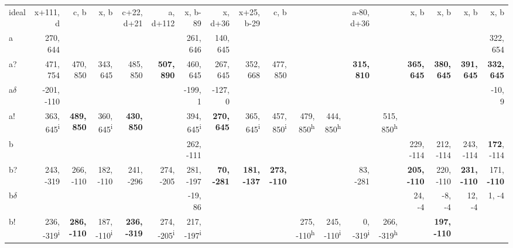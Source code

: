 \begin{table}[p]
{\begin{tabular}{lrrrrrrrrrrrrrrrrr}
ideal & x+111, d & c, b & x, b & c+22, d+21 & a, d+112 & x, b-89 & x, d+36 & x+25, b-29 & c, b &  &  & a-80, d+36 &  & x, b & x, b & x, b & x, b \\
a & 270, 644 &  &  &  &  & 261, 646 & 140, 645 &  &  &  &  &  &  &  &  &  & 322, 654 \\
a? & 471, 754 & 470, 850 & 343, 645 & 485, 850 & \textbf{507, 890} & 460, 645 & 267, 645 & 352, 668 & 477, 850 &  &  & \textbf{315, 810} &  & \textbf{365, 645} & \textbf{380, 645} & \textbf{391, 645} & \textbf{332, 645} \\
a$\delta$ & -201, -110 &  &  &  &  & -199, 1 & -127, 0 &  &  &  &  &  &  &  &  &  & -10, 9 \\
a! & 363, 645\textsuperscript{i} & \textbf{489, 850} & 360, 645\textsuperscript{i} & \textbf{430, 850} &  & 394, 645\textsuperscript{i} & \textbf{270, 645} & 365, 645\textsuperscript{i} & 457, 850\textsuperscript{i} & 479, 850\textsuperscript{h} & 444, 850\textsuperscript{h} &  & 515, 850\textsuperscript{h} &  &  &  &  \\
b &  &  &  &  &  & 262, -111 &  &  &  &  &  &  &  & 229, -114 & 212, -114 & 243, -114 & \textbf{172}, -114 \\
b? & 243, -319 & 266, -110 & 182, -110 & 241, -296 & 274, -205 & 281, -197 & \textbf{70, -281} & \textbf{181, -137} & \textbf{273, -110} &  &  & 83, -281 &  & \textbf{205, -110} & 220, -110 & \textbf{231, -110} & 171, \textbf{-110} \\
b$\delta$ &  &  &  &  &  & -19, 86 &  &  &  &  &  &  &  & 24, -4 & -8, -4 & 12, -4 & 1, -4 \\
b! & 236, -319\textsuperscript{i} & \textbf{286, -110} & 187, -110\textsuperscript{i} & \textbf{236, -319} & 274, -205\textsuperscript{i} & 217, -197\textsuperscript{i} &  &  &  & 275, -110\textsuperscript{h} & 245, -110\textsuperscript{i} & 0, -319\textsuperscript{i} & 266, -319\textsuperscript{h} &  & \textbf{197, -110} &  &  \\

\end{tabular}}
\end{table}
